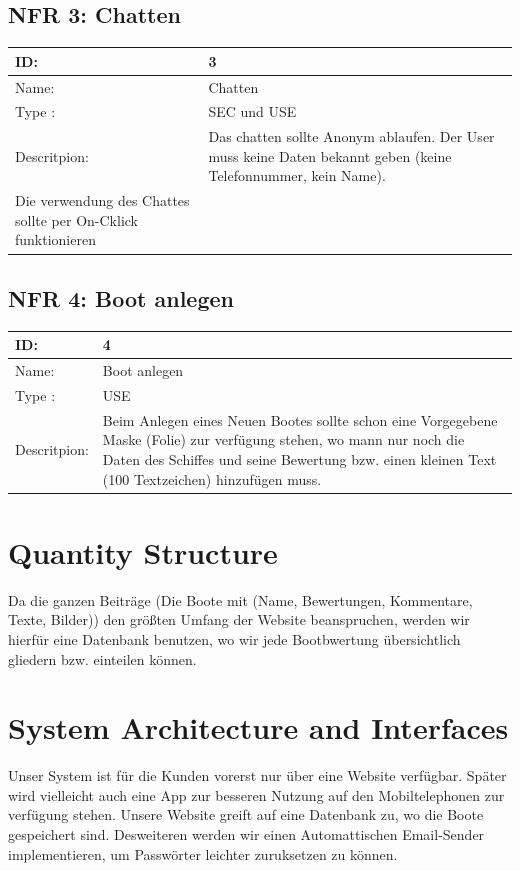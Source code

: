 \documentclass[12pt]{article}
\theoremstyle{definition}
\begin{document}
\subsection{NFR 3: Chatten}
\begin{tabular}{|p{.2\linewidth}|p{.65\linewidth}|}
\hline 
ID: & 3 \\ \hline
Name: & Chatten \\ \hline
Type	: & SEC und USE \\ \hline
Descritpion: &  Das chatten sollte Anonym ablaufen. Der User muss keine Daten bekannt geben (keine Telefonnummer, kein Name). \\Die verwendung des Chattes sollte per On-Cklick funktionieren \\ \hline
\end{tabular}

\subsection{NFR 4: Boot anlegen}
\begin{tabular}{|p{.2\linewidth}|p{.65\linewidth}|}
\hline 
ID: & 4 \\ \hline
Name: & Boot anlegen \\ \hline
Type	: & USE \\ \hline
Descritpion: &  Beim Anlegen eines Neuen Bootes sollte schon eine Vorgegebene Maske (Folie) zur verfügung stehen, wo mann nur noch die Daten des Schiffes und seine Bewertung bzw. einen kleinen Text (100 Textzeichen) hinzufügen muss.\\ \hline
\end{tabular}
\pagebreak

\section{Quantity Structure}
Da die ganzen Beiträge (Die Boote mit (Name, Bewertungen, Kommentare, Texte, Bilder)) den größten Umfang der Website beanspruchen, werden wir hierfür eine Datenbank benutzen, wo wir jede Bootbwertung übersichtlich gliedern bzw. einteilen können.

\pagebreak
\section{System Architecture and Interfaces}
Unser System ist für die Kunden vorerst nur über eine Website verfügbar. Später wird vielleicht auch eine App zur besseren Nutzung auf den Mobiltelephonen zur verfügung stehen. Unsere Website greift auf eine Datenbank zu, wo die Boote gespeichert sind. Desweiteren werden wir einen Automattischen Email-Sender implementieren, um Passwörter leichter zuruksetzen zu können.
\end{document}
